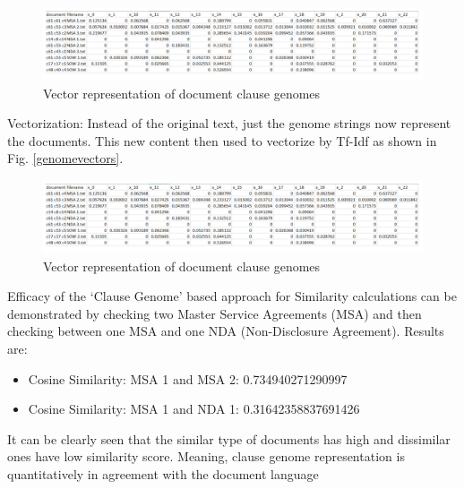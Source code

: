 \documentclass[english]{uspatent}
\begin{document}
 \begin{figure}[h!]
 \begin{center}
  \includegraphics[width=\linewidth]{img/genomevectors.png}
  \caption{Vector representation of document clause genomes}
  \label{fig:genomevectors}
 \end{center}
 \end{figure}

\patentParagraph Vectorization:
Instead of the original text, just the genome strings now represent the documents. This new content then used to vectorize by Tf-Idf as shown in Fig. \ref{genomevectors}.

 \begin{figure}[h!]
 \begin{center}
  \includegraphics[width=\linewidth]{img/genomevectors.png}
  \caption{Vector representation of document clause genomes}
  \label{fig:genomevectors}
 \end{center}
 \end{figure}
 
 Efficacy of the `Clause Genome' based approach for Similarity calculations can be demonstrated by checking two Master Service Agreements (MSA) and then checking between one MSA and one NDA (Non-Disclosure Agreement). Results are:

 \begin{itemize}
 \item Cosine Similarity: MSA 1 and MSA 2: 0.734940271290997 
\item Cosine Similarity: MSA 1 and NDA 1: 0.31642358837691426 
\end{itemize}

It can be clearly seen that the similar type of documents has high and dissimilar ones have low similarity score. Meaning, clause genome
representation is quantitatively in agreement with the document language


\patentClaimsStart
\end{document}
